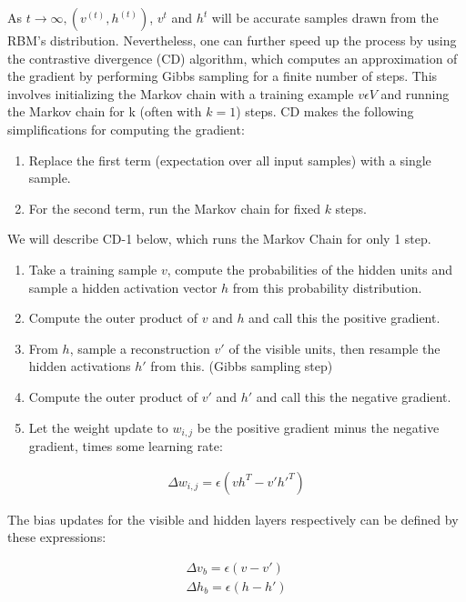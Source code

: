 \documentclass[journal]{IEEEtran}
\begin{document}
As $t \rightarrow \infty,  (v^{(t)},h^{(t)})$, $v^{t}$ and $h^{t}$ will be accurate samples drawn from the RBM's distribution. Nevertheless, one can further speed up the process by using the contrastive divergence (CD) algorithm, which computes an approximation of the gradient by performing Gibbs sampling for a finite number of steps. This involves initializing the Markov chain with a training example $v \epsilon V$ and running the Markov chain for k (often with $k = 1$) steps. CD makes the following simplifications for computing the gradient:

\begin{enumerate}
 \item Replace the first term (expectation over all input samples) with a single sample.
 \item For the second term, run the Markov chain for fixed $k$ steps.
\end{enumerate}

We will describe CD-1 below, which runs the Markov Chain for only 1 step.

\begin{enumerate}
\item Take a training sample $v$, compute the probabilities of the hidden units and sample a hidden activation vector $h$ from this probability distribution.
\item Compute the outer product of $v$ and $h$ and call this the positive gradient.
\item From $h$, sample a reconstruction $v'$ of the visible units, then resample the hidden activations $h'$ from this. (Gibbs sampling step)
\item Compute the outer product of $v'$ and $h'$ and call this the negative gradient.
\item Let the weight update to $w_{i,j}$ be the positive gradient minus the negative gradient, times some learning rate: 
\end{enumerate}

\begin{equation}
\begin{aligned}
\Delta w_{i,j} = \epsilon(vh^{T} - v'h'^{T})
\end{aligned}
\end{equation}

The bias updates for the visible and hidden layers respectively can be defined by these expressions:

\begin{equation}
\begin{aligned}
\Delta v_{b} = \epsilon(v - v')\\
\Delta h_{b} = \epsilon(h - h')\\
\end{aligned}
\end{equation}
\end{document}
